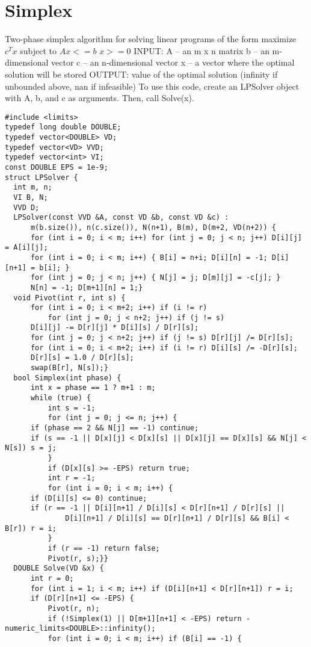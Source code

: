 \documentclass[11pt, oneside]{article}
\begin{document}
\section{Simplex}
Two-phase simplex algorithm for solving linear programs of the form
    maximize     $c^T x$
    subject to   $Ax <= b$
                 $x >= 0$
INPUT: A -- an m x n matrix
       b -- an m-dimensional vector
       c -- an n-dimensional vector
       x -- a vector where the optimal solution will be stored
OUTPUT: value of the optimal solution (infinity if unbounded
        above, nan if infeasible)
To use this code, create an LPSolver object with A, b, and c as
arguments.  Then, call Solve(x).
\begin{lstlisting}
#include <limits>
typedef long double DOUBLE;
typedef vector<DOUBLE> VD;
typedef vector<VD> VVD;
typedef vector<int> VI;
const DOUBLE EPS = 1e-9;
struct LPSolver {
  int m, n;
  VI B, N;
  VVD D;
  LPSolver(const VVD &A, const VD &b, const VD &c) : 
      m(b.size()), n(c.size()), N(n+1), B(m), D(m+2, VD(n+2)) {
      for (int i = 0; i < m; i++) for (int j = 0; j < n; j++) D[i][j] = A[i][j];
      for (int i = 0; i < m; i++) { B[i] = n+i; D[i][n] = -1; D[i][n+1] = b[i]; }
      for (int j = 0; j < n; j++) { N[j] = j; D[m][j] = -c[j]; }
      N[n] = -1; D[m+1][n] = 1;}
  void Pivot(int r, int s) {
      for (int i = 0; i < m+2; i++) if (i != r)
          for (int j = 0; j < n+2; j++) if (j != s)
      D[i][j] -= D[r][j] * D[i][s] / D[r][s];
      for (int j = 0; j < n+2; j++) if (j != s) D[r][j] /= D[r][s];
      for (int i = 0; i < m+2; i++) if (i != r) D[i][s] /= -D[r][s];
      D[r][s] = 1.0 / D[r][s];
      swap(B[r], N[s]);}
  bool Simplex(int phase) {
      int x = phase == 1 ? m+1 : m;
      while (true) {
          int s = -1;
          for (int j = 0; j <= n; j++) {
      if (phase == 2 && N[j] == -1) continue;
      if (s == -1 || D[x][j] < D[x][s] || D[x][j] == D[x][s] && N[j] < N[s]) s = j;
          }
          if (D[x][s] >= -EPS) return true;
          int r = -1;
          for (int i = 0; i < m; i++) {
      if (D[i][s] <= 0) continue;
      if (r == -1 || D[i][n+1] / D[i][s] < D[r][n+1] / D[r][s] ||
              D[i][n+1] / D[i][s] == D[r][n+1] / D[r][s] && B[i] < B[r]) r = i;
          }
          if (r == -1) return false;
          Pivot(r, s);}}
  DOUBLE Solve(VD &x) {
      int r = 0;
      for (int i = 1; i < m; i++) if (D[i][n+1] < D[r][n+1]) r = i;
      if (D[r][n+1] <= -EPS) {
          Pivot(r, n);
          if (!Simplex(1) || D[m+1][n+1] < -EPS) return -numeric_limits<DOUBLE>::infinity();
          for (int i = 0; i < m; i++) if (B[i] == -1) {

\end{lstlisting}
\end{document}
